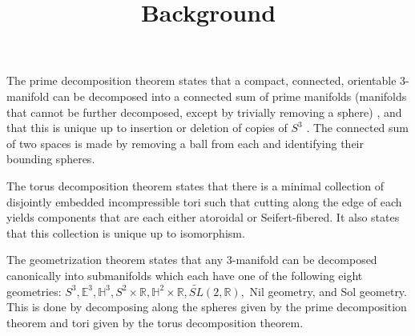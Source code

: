 \documentclass[12pt]{amsart}
\newcommand{\ignore}[1]{}
\begin{document}
\title{Background}
\maketitle

\ignore{1.  Describe 3-manifold decompositions.
  A.  Prime decomposition theorem -- see Allen Hatcher's notes for statement and references.

}
\ignore{@Misc{•,
OPTkey = {•},
OPTauthor = {Allen Hatcher},
OPTtitle = {Notes on Basic 3-Manifold Topology},
OPThowpublished = {•},
OPTmonth = {•},
OPTyear = {•},
OPTnote = {•},
OPTannote = {•}
}}

The prime decomposition theorem states that a compact, connected, orientable 3-manifold can be decomposed into a connected sum of prime manifolds (manifolds that cannot be further decomposed, except by trivially removing a sphere) \cite{Kneser}, and that this is unique up to insertion or deletion of copies of $S^3$ \cite{Milnor}. The connected sum of two spaces is made by removing a ball from each and identifying their bounding spheres.
  

The torus decomposition theorem states that there is a minimal collection of disjointly embedded incompressible tori such that cutting along the edge of each yields components that are each either atoroidal or Seifert-fibered. It also states that this collection is unique up to isomorphism.



The geometrization theorem states that any 3-manifold can be decomposed canonically into submanifolds which each have one of the following eight geometries: $S^3, \mathbb{E}^3, \mathbb{H}^3, S^2 \times \mathbb{R}, \mathbb{H}^2 \times \mathbb{R}, \tilde{SL}(2,\mathbb{R}),$ Nil geometry, and Sol geometry. This is done by decomposing along the spheres given by the prime decomposition theorem and tori given by the torus decomposition theorem. \cite{Perelman1} \cite{Perelman2} \cite{Perelman3}

\end{document}
